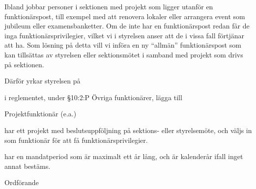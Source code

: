 \documentclass[../_main/handlingar.tex]{subfiles}
\begin{document}

Ibland jobbar personer i sektionen med projekt som ligger utanför en funktionärspost, till exempel med att renovera lokaler eller arrangera event som jubileum eller examensbanketter. Om de inte har en funktionärspost redan får de inga funktionärsprivilegier, vilket vi i styrelsen anser att de i vissa fall förtjänar att ha. Som lösning på detta vill vi införa en ny ``allmän'' funktionärspost som kan tillsättas av styrelsen eller sektionsmötet i samband med projekt som drivs på sektionen.

Därför yrkar styrelsen på

\begin{attsatser}
    \att i reglementet, under \S10:2:P Övriga funktionärer, lägga till\par
        Projektfunktionär (e.a.)
        \begin{tightdashlist}
            \item har ett projekt med beslutsuppföljning på sektions- eller styrelsemöte, och väljs in som funktionär för att få funktionärsprivilegier.
            \item har en mandatperiod som är maximalt ett år lång, och är kalenderår ifall inget annat bestäms.
        \end{tightdashlist}
\end{attsatser}

\begin{signatures}{1}
    \ist
    \signature{\ordf}{Ordförande}
\end{signatures}
\end{document}

